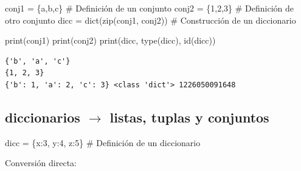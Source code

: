 \documentclass[
  spanish,
  letterpaper,
]{scrbook}
\newenvironment{Shaded}{\begin{snugshade}}{\end{snugshade}}
\newcommand{\BuiltInTok}[1]{\textcolor[rgb]{0.00,0.23,0.31}{#1}}
\newcommand{\CommentTok}[1]{\textcolor[rgb]{0.37,0.37,0.37}{#1}}
\newcommand{\DecValTok}[1]{\textcolor[rgb]{0.68,0.00,0.00}{#1}}
\newcommand{\NormalTok}[1]{\textcolor[rgb]{0.00,0.23,0.31}{#1}}
\newcommand{\OperatorTok}[1]{\textcolor[rgb]{0.37,0.37,0.37}{#1}}
\newcommand{\StringTok}[1]{\textcolor[rgb]{0.13,0.47,0.30}{#1}}
\theoremstyle{definition}
\theoremstyle{remark}
\begin{document}
\begin{Shaded}
\begin{Highlighting}[]
\NormalTok{conj1 }\OperatorTok{=}\NormalTok{ \{}\StringTok{\textquotesingle{}a\textquotesingle{}}\NormalTok{,}\StringTok{\textquotesingle{}b\textquotesingle{}}\NormalTok{,}\StringTok{\textquotesingle{}c\textquotesingle{}}\NormalTok{\} }\CommentTok{\# Definición de un conjunto}
\NormalTok{conj2 }\OperatorTok{=}\NormalTok{ \{}\DecValTok{1}\NormalTok{,}\DecValTok{2}\NormalTok{,}\DecValTok{3}\NormalTok{\}       }\CommentTok{\# Definición de otro conjunto}
\NormalTok{dicc }\OperatorTok{=} \BuiltInTok{dict}\NormalTok{(}\BuiltInTok{zip}\NormalTok{(conj1, conj2)) }\CommentTok{\# Construcción de un diccionario}

\BuiltInTok{print}\NormalTok{(conj1)}
\BuiltInTok{print}\NormalTok{(conj2)}
\BuiltInTok{print}\NormalTok{(dicc, }\BuiltInTok{type}\NormalTok{(dicc), }\BuiltInTok{id}\NormalTok{(dicc))}
\end{Highlighting}
\end{Shaded}

\begin{verbatim}
{'b', 'a', 'c'}
{1, 2, 3}
{'b': 1, 'a': 2, 'c': 3} <class 'dict'> 1226050091648
\end{verbatim}

\subsection{\texorpdfstring{diccionarios \(\to\) listas, tuplas y
conjuntos}{diccionarios \textbackslash to listas, tuplas y conjuntos}}\label{diccionarios-to-listas-tuplas-y-conjuntos}

\begin{Shaded}
\begin{Highlighting}[]
\NormalTok{dicc }\OperatorTok{=}\NormalTok{ \{}\StringTok{\textquotesingle{}x\textquotesingle{}}\NormalTok{:}\DecValTok{3}\NormalTok{, }\StringTok{\textquotesingle{}y\textquotesingle{}}\NormalTok{:}\DecValTok{4}\NormalTok{, }\StringTok{\textquotesingle{}z\textquotesingle{}}\NormalTok{:}\DecValTok{5}\NormalTok{\} }\CommentTok{\# Definición de un diccionario}
\end{Highlighting}
\end{Shaded}

Conversión directa:
\end{document}
